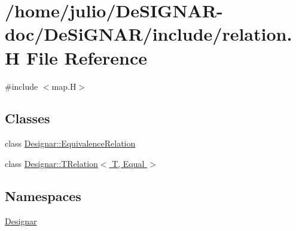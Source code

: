 \hypertarget{relation_8_h}{}\section{/home/julio/\+De\+S\+I\+G\+N\+A\+R-\/doc/\+De\+Si\+G\+N\+A\+R/include/relation.H File Reference}
\label{relation_8_h}
{\ttfamily \#include $<$map.\+H$>$}\newline
\subsection*{Classes}
\begin{DoxyCompactItemize}
\item 
class \hyperlink{class_designar_1_1_equivalence_relation}{Designar\+::\+Equivalence\+Relation}
\item 
class \hyperlink{class_designar_1_1_t_relation}{Designar\+::\+T\+Relation$<$ T, Equal $>$}
\end{DoxyCompactItemize}
\subsection*{Namespaces}
\begin{DoxyCompactItemize}
\item 
 \hyperlink{namespace_designar}{Designar}
\end{DoxyCompactItemize}
